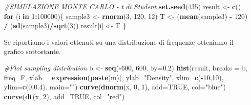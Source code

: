 \documentclass[a4paper,12pt,oneside]{book}
\newenvironment{Shaded}{\begin{snugshade}}{\end{snugshade}}
\newcommand{\KeywordTok}[1]{\textcolor[rgb]{0.13,0.29,0.53}{\textbf{#1}}}
\newcommand{\DataTypeTok}[1]{\textcolor[rgb]{0.13,0.29,0.53}{#1}}
\newcommand{\DecValTok}[1]{\textcolor[rgb]{0.00,0.00,0.81}{#1}}
\newcommand{\FloatTok}[1]{\textcolor[rgb]{0.00,0.00,0.81}{#1}}
\newcommand{\StringTok}[1]{\textcolor[rgb]{0.31,0.60,0.02}{#1}}
\newcommand{\CommentTok}[1]{\textcolor[rgb]{0.56,0.35,0.01}{\textit{#1}}}
\newcommand{\OtherTok}[1]{\textcolor[rgb]{0.56,0.35,0.01}{#1}}
\newcommand{\ControlFlowTok}[1]{\textcolor[rgb]{0.13,0.29,0.53}{\textbf{#1}}}
\newcommand{\OperatorTok}[1]{\textcolor[rgb]{0.81,0.36,0.00}{\textbf{#1}}}
\newcommand{\NormalTok}[1]{#1}
\theoremstyle{definition}
\theoremstyle{definition}
\theoremstyle{definition}
\theoremstyle{remark}
\begin{document}
\begin{Shaded}
\begin{Highlighting}[]
\CommentTok{#SIMULAZIONE MONTE CARLO - t di Student}
\KeywordTok{set.seed}\NormalTok{(}\DecValTok{435}\NormalTok{)}
\NormalTok{result <-}\StringTok{ }\KeywordTok{c}\NormalTok{()}
\ControlFlowTok{for}\NormalTok{ (i }\ControlFlowTok{in} \DecValTok{1}\OperatorTok{:}\DecValTok{100000}\NormalTok{)\{}
\NormalTok{  sample3 <-}\StringTok{ }\KeywordTok{rnorm}\NormalTok{(}\DecValTok{3}\NormalTok{, }\DecValTok{120}\NormalTok{, }\DecValTok{12}\NormalTok{)}
\NormalTok{  T <-}\StringTok{ }\NormalTok{(}\KeywordTok{mean}\NormalTok{(sample3) }\OperatorTok{-}\StringTok{ }\DecValTok{120}\NormalTok{) }\OperatorTok{/}\StringTok{ }\NormalTok{(}\KeywordTok{sd}\NormalTok{(sample3)}\OperatorTok{/}\KeywordTok{sqrt}\NormalTok{(}\DecValTok{3}\NormalTok{))}
\NormalTok{  result[i] <-}\StringTok{ }\NormalTok{T}
\NormalTok{  \}}
\end{Highlighting}
\end{Shaded}

Se riportiamo i valori ottenuti su una distribuzione di frequenze
otteniamo il grafico sottostante.

\begin{Shaded}
\begin{Highlighting}[]
\CommentTok{#Plot sampling distribution}
\NormalTok{b <-}\StringTok{ }\KeywordTok{seq}\NormalTok{(}\OperatorTok{-}\DecValTok{600}\NormalTok{, }\DecValTok{600}\NormalTok{, }\DataTypeTok{by=}\FloatTok{0.2}\NormalTok{)}
\KeywordTok{hist}\NormalTok{(result, }\DataTypeTok{breaks =}\NormalTok{ b, }\DataTypeTok{freq=}\NormalTok{F, }\DataTypeTok{xlab =} \KeywordTok{expression}\NormalTok{(}\KeywordTok{paste}\NormalTok{(m)), }\DataTypeTok{ylab=}\StringTok{"Density"}\NormalTok{, }\DataTypeTok{xlim=}\KeywordTok{c}\NormalTok{(}\OperatorTok{-}\DecValTok{10}\NormalTok{,}\DecValTok{10}\NormalTok{), }\DataTypeTok{ylim=}\KeywordTok{c}\NormalTok{(}\DecValTok{0}\NormalTok{,}\FloatTok{0.4}\NormalTok{), }\DataTypeTok{main=}\StringTok{""}\NormalTok{)}
\KeywordTok{curve}\NormalTok{(}\KeywordTok{dnorm}\NormalTok{(x, }\DecValTok{0}\NormalTok{, }\DecValTok{1}\NormalTok{), }\DataTypeTok{add=}\OtherTok{TRUE}\NormalTok{, }\DataTypeTok{col=}\StringTok{"blue"}\NormalTok{)}
\KeywordTok{curve}\NormalTok{(}\KeywordTok{dt}\NormalTok{(x, }\DecValTok{2}\NormalTok{), }\DataTypeTok{add=}\OtherTok{TRUE}\NormalTok{, }\DataTypeTok{col=}\StringTok{"red"}\NormalTok{)}
\end{Highlighting}
\end{Shaded}
\end{document}
